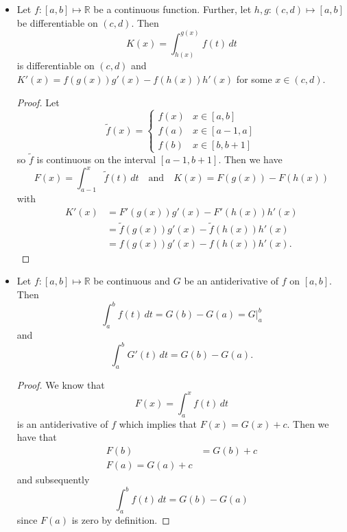 \documentclass{article}
\newcommand{\R}{\mathbb{R}}
\newcommand{\?}{\stackrel{?}{=}}
\theoremstyle{definition} %
\begin{document}
\begin{itemize}
\begin{proof}
        Take $x \in [a, b]$. By the IMVT, there exists some $c(x) \in [a, x]$ such that $f(c(x))(x - a) = \int_a^x f(t) \,dt = F(x)$ and
        $$\lim_{x \to a^+} f(x) = \lim_{x \to a^+} f(c(x))(c - a) = 0 = F(a).$$
        The argument is identical for $F(b) = f(b)$.
    \end{proof}
    \item[]
    \begin{lemma}
        Let $f: [a, b] \mapsto \R$ be a continuous function. Further, let $h, g: (c, d) \mapsto [a, b]$ be differentiable on $(c, d)$. Then
        $$K(x) = \int_{h(x)}^{g(x)} f(t) \,dt$$
        is differentiable on $(c, d)$ and $K'(x) = f(g(x))g'(x) - f(h(x))h'(x)$ for some $x \in (c, d)$.
    \end{lemma}
    \begin{proof}
        Let
        \[
        \widetilde{f}(x) =
        \begin{cases}
            f(x) & x \in [a, b] \\
            f(a) & x \in [a - 1, a] \\
            f(b) & x \in [b, b + 1]
        \end{cases}
        \]
        so $\widetilde{f}$ is continuous on the interval $[a - 1, b + 1]$. Then we have
        $$F(x) = \int_{a - 1}^x \widetilde{f}(t) \,dt \quad \text{and} \quad K(x) = F(g(x)) - F(h(x))$$
        with
        \begin{align*}
            K'(x) &= F'(g(x))g'(x) - F'(h(x))h'(x) \\
            &= \widetilde{f}(g(x))g'(x) - \widetilde{f}(h(x))h'(x) \\
            &= f(g(x))g'(x) - f(h(x))h'(x).
        \end{align*}
    \end{proof}
    \item[]
    \begin{theorem}
        Let $f: [a, b] \mapsto \R$ be continuous and $G$ be an antiderivative of $f$ on $[a, b]$. Then
        $$\int_a^b f(t) \,dt = G(b) - G(a) = G \bigg|_a^b$$
        and
        $$\int_a^b G'(t) \,dt = G(b) - G(a).$$
        \label{thm:ftc}
    \end{theorem}
    \begin{proof}
        We know that
        $$F(x) = \int_a^x f(t) \,dt$$
        is an antiderivative of $f$ which implies that $F(x) = G(x) + c$. Then we have that
        \begin{align*}
            F(b) &= G(b) + c \\
            F(a) = G(a) + c
        \end{align*}
        and subsequently
        $$\int_a^b f(t) \,dt = G(b) - G(a)$$
        since $F(a)$ is zero by definition.
    \end{proof}
\end{itemize}
\end{document}
